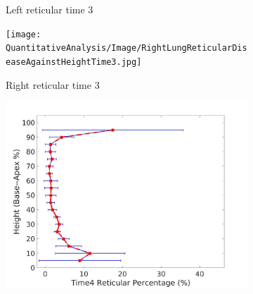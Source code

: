 \begin{figure}[H]
\begin{subfigure}{.41\linewidth}
  \caption{Left reticular time 3}
  \label{fig:DiseaseAgainstHeightOverTime2-e} 
\end{subfigure} 
\begin{subfigure}{.41\linewidth}%
  \texttt{[image: QuantitativeAnalysis/Image/RightLungReticularDiseaseAgainstHeightTime3.jpg]}
  \caption{Right reticular time 3}
  \label{fig:DiseaseAgainstHeightOverTime2-f}
\end{subfigure}
\begin{subfigure}{.41\linewidth}%
  \includegraphics[width=\linewidth,trim={{.0\wd0} {.0\wd0} {.0\wd0} {.0\wd0}},clip]{QuantitativeAnalysis/Image/LeftLungReticularDiseaseAgainstHeightTime4.jpg} %

\end{subfigure}
\end{figure}
